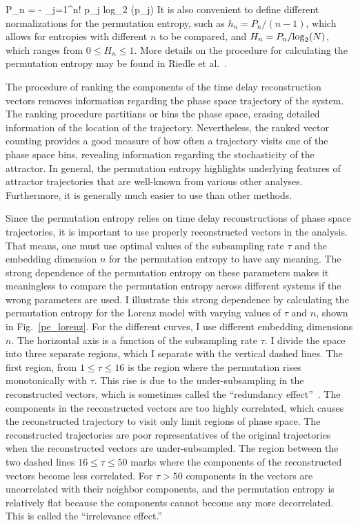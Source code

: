 \beq
\label{perm_ent}
P_n = - \sum_{j=1}^{n!} p_j {\rm{log}}_2 (p_j)
\eeq
It is also convenient to define different normalizations for the permutation entropy, such as $h_n = P_n/(n-1)$, which allows for entropies with different $n$ to be compared, and
$H_n = P_n/{\rm{log}}_2 (N)$, which ranges from $0 \le H_n \le 1$. More details on the procedure for calculating the permutation entropy may be found in Riedle et al.~\cite{riedle2013}.

The procedure of ranking the components of the time delay reconstruction vectors removes information regarding the phase space trajectory of the system.
The ranking procedure partitians or bins the phase space, erasing detailed information of the location of the trajectory. Nevertheless, the ranked vector counting provides a good measure of how
often a trajectory visits one of the phase space bins, revealing information regarding the stochasticity of the attractor. In general, the permutation entropy highlights underlying features
of attractor trajectories that are well-known from various other analyses. Furthermore, it is generally much easier to use than other methods.

Since the permutation entropy relies on time delay reconstructions of phase space trajectories, it is important to use properly reconstructed vectors in the analysis. That means, one must use
optimal values of the subsampling rate $\tau$ and the embedding dimension $n$ for the permutation entropy to have any meaning. The strong dependence of the permutation entropy on these
parameters makes it meaningless to compare the permutation entropy across different systems if the wrong parameters are used. 
I illustrate this strong dependence by calculating the permutation entropy for the Lorenz model
with varying values of $\tau$ and $n$, shown in Fig.~\ref{pe_lorenz}. For the different curves, I use different embedding dimensions $n$. The horizontal axis is a function of the subsampling rate
$\tau$. I divide the space into three separate regions, which I separate with the vertical dashed lines. The first region, from $1 \le \tau \le 16$ is the region where the permutation rises
monotonically with $\tau$. This rise is due to the under-subsampling in the reconstructed vectors, which is sometimes called the ``redundancy effect''~\cite{riedle2013}. The components in the
reconstructed vectors are too highly correlated, which causes the reconstructed trajectory to visit only limit regions of phase space. The reconstructed trajectories are poor representatives
of the original trajectories when the reconstructed vectors are under-subsampled. The region between the two dashed lines $16 \le \tau \le 50$ marks where 
the components of the reconstructed vectors become less correlated. 
For $\tau > 50$ components in the vectors are uncorrelated with their neighbor components, and the permutation entropy is relatively flat because the components cannot become any more decorrelated. 
This is called the ``irrelevance effect.''

